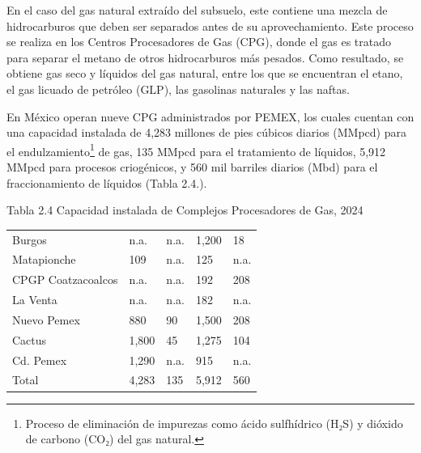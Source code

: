 \documentclass{sener2025}
\begin{document}
En el caso del gas natural extraído del subsuelo, este contiene una mezcla de hidrocarburos que deben ser separados antes de su aprovechamiento. Este proceso se realiza en los Centros Procesadores de Gas (CPG), donde el gas es tratado para separar el metano de otros hidrocarburos más pesados. Como resultado, se obtiene gas seco y líquidos del gas natural, entre los que se encuentran el etano, el gas licuado de petróleo (GLP), las gasolinas naturales y las naftas.

En México operan nueve CPG administrados por PEMEX, los cuales cuentan con una capacidad instalada de 4,283 millones de pies cúbicos diarios (MMpcd) para el endulzamiento\footnote{Proceso de eliminación de impurezas como ácido sulfhídrico (H₂S) y dióxido de carbono (CO₂) del gas natural.} de gas, 135 MMpcd para el tratamiento de líquidos, 5,912 MMpcd para procesos criogénicos, y 560 mil barriles diarios (Mbd) para el fraccionamiento de líquidos (Tabla 2.4.).

\begin{tabladoradoCorto}
  \caption{Tabla 2.4 Capacidad instalada de Complejos Procesadores de Gas, 2024}
  \label{tab:tabla_2_4_capacidad_instalada_}
  \begin{tabularx}{\textwidth}{Vvvvv}
    \toprule
      &  &  &  &  \\
    \midrule
    Burgos & n.a. & n.a. & 1,200 & 18 \\
    Matapionche & 109 & n.a. & 125 & n.a. \\
    CPGP Coatzacoalcos & n.a. & n.a. & 192 & 208 \\
    La Venta & n.a. & n.a. & 182 & n.a. \\
    Nuevo Pemex & 880 & 90 & 1,500 & 208 \\
    Cactus & 1,800 & 45 & 1,275 & 104 \\
    Cd. Pemex & 1,290 & n.a. & 915 & n.a. \\
    Total & 4,283 & 135 & 5,912 & 560 \\
    \bottomrule
  \end{tabularx}
\end{tabladoradoCorto}
\vspace{-4pt}
\end{document}
